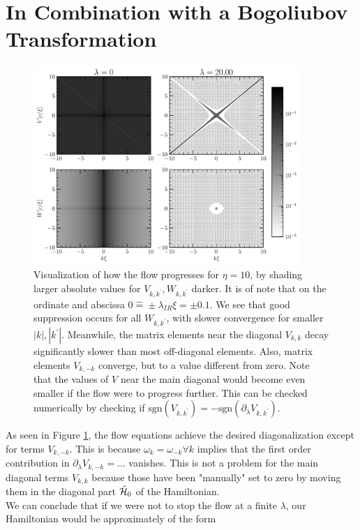 \section{In Combination with a Bogoliubov Transformation}
\begin{figure}[H]
    \centering
    \includegraphics[width=0.9\textwidth]{figures/plots/PDF/FlowIllustration.pdf}
    \caption[Flow Visualization for $\eta=10$]{Visualization of how the flow progresses for $\eta=10$, by shading larger absolute values for $V_{k,k^\prime},W_{k,k^\prime}$ darker. It is of note that on the ordinate and abscissa $0\widehat = \pm \lambda_{IR}\xi=\pm 0.1$. We see that good suppression occurs for all $W_{k,k^\prime}$, with slower convergence for smaller $|k|,|k^\prime|$.  Meanwhile, the matrix elements near the diagonal $V_{k,k}$ decay significantly slower than most off-diagonal elements. Also, matrix elements $V_{k,-k}$ converge, but to a value different from zero. Note that the values of $V$ near the main diagonal would  become even smaller if the flow were to progress further. This can be checked numerically by checking if $\mathrm{sgn}\left( V_{k,k^\prime}\right)=-\mathrm{sgn}\left( \partial_\lambda V_{k,k^\prime}\right)$.}
    \label{FlowIllustration}
\end{figure}
As seen in Figure \ref{FlowIllustration}, the flow equations achieve the desired diagonalization except for terms $V_{k,-k}$. This is because $\omega_k=\omega_{-k}\forall k$ implies that the first order contribution in $\partial_\lambda V_{k,-k} =...$ vanishes. This is not a problem for the main diagonal terms $V_{k,k}$ because those have been "manually" set to zero by moving them in the diagonal part $\hat{\mathcal{H}}_0$ of the Hamiltonian.\\ We can conclude that if we were not to stop the flow at a finite $\lambda$, our Hamiltonian would be approximately of the form 
